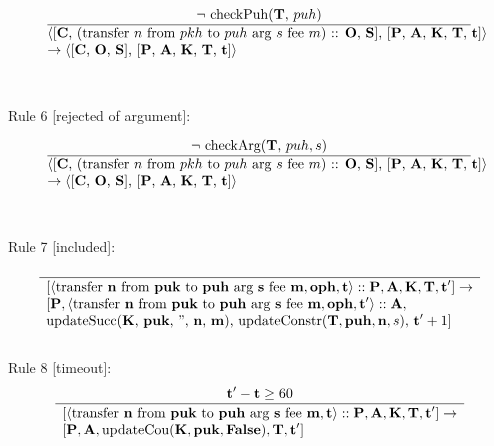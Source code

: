\documentclass[a4paper]{llncs}
\begin{document}
\begin{equation}{}
\frac{\text{$\neg$ checkPuh(\CONTRACTORS, $puh$)}}{\parbox{4.2in}{\text{$\langle$[\ACCOUNTS, (transfer ${n}$ from ${pkh}$ to  ${puh}$ arg ${s}$ fee ${m}$) :: \OPERATIONS, \CONTRACTS], [\PENDING, \ACCEPTED, \MANAGERS, \CONTRACTORS, \TIME]$\rangle$ }\\
\text{$\rightarrow \langle$[\ACCOUNTS, \OPERATIONS, \CONTRACTS], [\PENDING, \ACCEPTED, \MANAGERS, \CONTRACTORS, \TIME]$\rangle$}}} 
\end{equation}
~\\
~\\
Rule 6 [rejected of argument]:

\begin{equation}{}
\frac{\text{$\neg$ checkArg(\CONTRACTORS, $puh, s$)}}{\parbox{4.2in}{\text{$\langle$[\ACCOUNTS, (transfer ${n}$ from ${pkh}$ to  ${puh}$ arg ${s}$ fee ${m}$) :: \OPERATIONS, \CONTRACTS], [\PENDING, \ACCEPTED, \MANAGERS, \CONTRACTORS, \TIME]$\rangle$}\\
\text{$\rightarrow \langle$[\ACCOUNTS, \OPERATIONS, \CONTRACTS], [\PENDING, \ACCEPTED, \MANAGERS, \CONTRACTORS, \TIME]$\rangle$}}} 
\end{equation}
~\\
~\\
Rule 7 [included]:

\begin{equation}
\frac{}{
  \begin{array}{l}
    {[\langle \TRANSFER[\STRING]\NTEZ\PUK\PUH\MTEZ, \OPH, \TIME
    \rangle :: \PENDING, \ACCEPTED, \MANAGERS, \CONTRACTORS, \TIME']}
    \rightarrow \\
    {}[\PENDING, \langle \TRANSFER[\STRING]\NTEZ\PUK\PUH\MTEZ, \OPH, \TIME' \rangle :: \ACCEPTED,  \\
    \text{updateSucc(\MANAGERS, \PUK, '', \NTEZ, \MTEZ), updateConstr$(\CONTRACTORS, \PUH, \NTEZ,
  s)$, $\TIME' + 1$]}
  \end{array}
}\label{eq:1}
\end{equation}
~\\
Rule 8 [timeout]:
\begin{equation}{}
  \frac{\TIME' - \TIME \ge 60}{
    \begin{array}{l}
      {}[\langle\TRANSFER[\STRING]\NTEZ\PUK\PUH\MTEZ, \TIME\rangle ::
      \PENDING, \ACCEPTED, \MANAGERS, \CONTRACTORS, \TIME' ]
      \rightarrow \\
      {}[\PENDING, \ACCEPTED, \UPDATECOU(\MANAGERS, \PUK, \FALSE), \CONTRACTORS, \TIME']
    \end{array}
    }
\end{equation}
\end{document}

